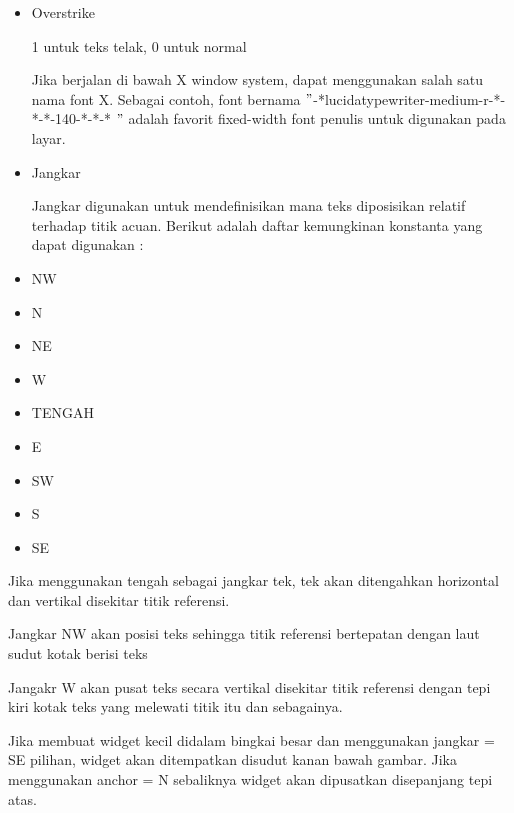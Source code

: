 \documentclass{wileySix}
\begin{document}
\begin{myEnumerate}
{\begin{myEnumerate}
\begin{itemize}
		\noindent 
		\item Overstrike \par
		1 untuk teks telak, 0 untuk normal \par
		Jika berjalan di bawah X window system, dapat menggunakan salah satu nama font X. Sebagai contoh, font bernama  $ " $-*lucidatypewriter-medium-r-*-*-*-140-*-*-* $ " $ adalah favorit fixed-width font penulis untuk digunakan pada layar. \par
		\noindent 
		\item Jangkar \par
		\noindent 
		Jangkar digunakan untuk mendefinisikan mana teks diposisikan relatif terhadap titik acuan. Berikut adalah daftar kemungkinan konstanta yang dapat digunakan : \par
		\noindent 
		\item NW \par
		\noindent 
		\item N \par
		\noindent 
		\item NE \par
		\noindent 
		\item W \par
		\noindent 
		\item TENGAH \par
		\noindent 
		\item E \par
		\noindent 
		\item SW \par
		\noindent 
		\item S \par
		\noindent 
		\item SE\end{itemize}
	\par
	\vspace{12pt}
	Jika menggunakan tengah sebagai jangkar tek, tek akan ditengahkan horizontal dan vertikal disekitar titik referensi. \par
	Jangkar NW akan posisi teks sehingga titik referensi bertepatan dengan laut sudut kotak berisi teks \par
	Jangakr W akan pusat teks secara vertikal disekitar titik referensi dengan tepi kiri kotak teks yang melewati titik itu dan sebagainya. \par
	Jika membuat widget kecil didalam bingkai besar dan menggunakan jangkar = SE pilihan, widget akan ditempatkan disudut kanan bawah gambar. Jika menggunakan anchor = N sebaliknya widget akan dipusatkan disepanjang tepi atas. \par

\end{myEnumerate}}
\end{myEnumerate}
\end{document}
